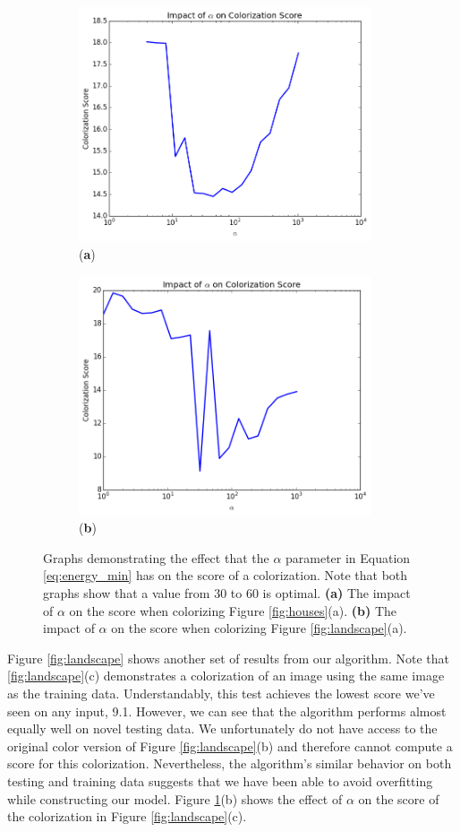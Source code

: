 \begin{figure}
    \centering
    \begin{subfigure}{3.5in}
        \centering
        \includegraphics[width=3.4in]{./Images/alpha_graph_house1.png}
        \caption{(\textbf{a})}
    \end{subfigure}
    \begin{subfigure}{3.5in}
        \centering
        \includegraphics[width=3.4in]{./Images/alpha_graph_mountain.png}
        \caption{(\textbf{b})}
    \end{subfigure}
    \caption{Graphs demonstrating the effect that the $\alpha$ parameter in Equation \ref{eq:energy_min} has on the score of a colorization.  Note that both graphs show that a value from 30 to 60 is optimal. \textbf{(a)} The impact of $\alpha$ on the score when colorizing Figure \ref{fig:houses}(a). \textbf{(b)} The impact of $\alpha$ on the score when colorizing Figure \ref{fig:landscape}(a).}
    \label{fig:alpha_graphs}
\end{figure}

Figure \ref{fig:landscape} shows another set of results from our algorithm.  Note that \ref{fig:landscape}(c) demonstrates a colorization of an image using the same image as the training data.  Understandably, this test achieves the lowest score we've seen on any input, 9.1.  However, we can see that the algorithm performs almost equally well on novel testing data.  We unfortunately do not have access to the original color version of Figure \ref{fig:landscape}(b) and therefore cannot compute a score for this colorization.  Nevertheless, the algorithm's similar behavior on both testing and training data suggests that we have been able to avoid overfitting while constructing our model.  Figure \ref{fig:alpha_graphs}(b) shows the effect of $\alpha$ on the score of the colorization in Figure \ref{fig:landscape}(c).

